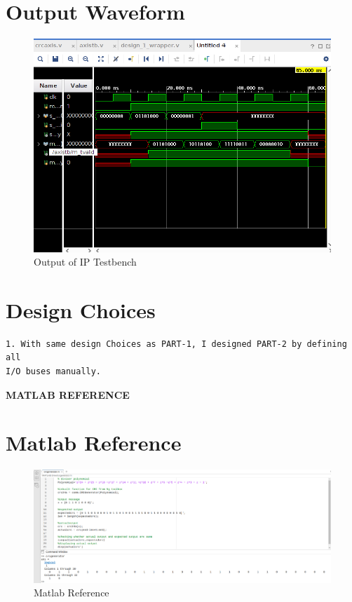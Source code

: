 \documentclass{article}
\begin{document}
\vspace{1cm}


\section{Output Waveform}
\vspace{1cm}
\begin{figure}[h]
    \centering
\includegraphics[width=\columnwidth]{figs/p2ipwav.png}
    \caption{Output of IP Testbench}
    \label{fig:my_label}
\end{figure}

\vspace{1cm}
\section{Design Choices}
\vspace{1cm}
\begin{lstlisting}
1. With same design Choices as PART-1, I designed PART-2 by defining all 
I/O buses manually.

\end{lstlisting}
\vspace{15cm}
\maketitle
\hfill \textbf{MATLAB REFERENCE}
\section{Matlab Reference}
\begin{figure}[h]
\centering
\includegraphics[width=1.3\textwidth]{figs/actual_matlab.png}
    \caption{Matlab Reference}
    \label{fig:my_label}
\end{figure}
\vspace{3cm}
\end{document}
